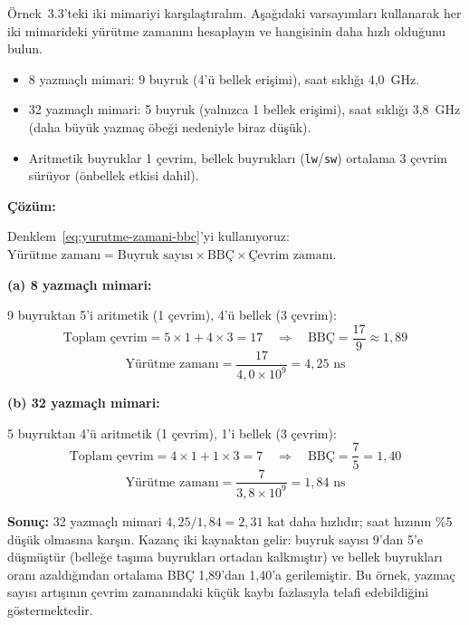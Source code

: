 \begin{ornek}[3.4]
\label{orn:yazmac-basarim}
Örnek~3.3'teki iki mimariyi karşılaştıralım. Aşağıdaki varsayımları kullanarak her iki mimarideki yürütme zamanını hesaplayın ve hangisinin daha hızlı olduğunu bulun.

\begin{itemize}[nosep]
\item 8 yazmaçlı mimari: 9 buyruk (4'ü bellek erişimi), saat sıklığı 4{,}0~GHz.
\item 32 yazmaçlı mimari: 5 buyruk (yalnızca 1 bellek erişimi), saat sıklığı 3{,}8~GHz (daha büyük yazmaç öbeği nedeniyle biraz düşük).
\item Aritmetik buyruklar 1 çevrim, bellek buyrukları (\texttt{lw}/\texttt{sw}) ortalama 3 çevrim sürüyor (önbellek etkisi dahil).
\end{itemize}

\textbf{Çözüm:}

Denklem~\ref{eq:yurutme-zamani-bbc}'yi kullanıyoruz: $\text{Yürütme zamanı} = \text{Buyruk sayısı} \times \text{BBÇ} \times \text{Çevrim zamanı}$.

\medskip
\textbf{(a) 8 yazmaçlı mimari:}

9 buyruktan 5'i aritmetik (1 çevrim), 4'ü bellek (3 çevrim):
\[
\text{Toplam çevrim} = 5 \times 1 + 4 \times 3 = 17 \quad\Rightarrow\quad \text{BBÇ} = \frac{17}{9} \approx 1{,}89
\]
\[
\text{Yürütme zamanı} = \frac{17}{4{,}0 \times 10^{9}} = 4{,}25 \text{ ns}
\]

\textbf{(b) 32 yazmaçlı mimari:}

5 buyruktan 4'ü aritmetik (1 çevrim), 1'i bellek (3 çevrim):
\[
\text{Toplam çevrim} = 4 \times 1 + 1 \times 3 = 7 \quad\Rightarrow\quad \text{BBÇ} = \frac{7}{5} = 1{,}40
\]
\[
\text{Yürütme zamanı} = \frac{7}{3{,}8 \times 10^{9}} = 1{,}84 \text{ ns}
\]

\textbf{Sonuç:} 32 yazmaçlı mimari $4{,}25 / 1{,}84 = 2{,}31$ kat daha hızlıdır; saat hızının \%5 düşük olmasına karşın. Kazanç iki kaynaktan gelir: buyruk sayısı 9'dan 5'e düşmüştür (belleğe taşıma buyrukları ortadan kalkmıştır) ve bellek buyrukları oranı azaldığından ortalama BBÇ 1{,}89'dan 1{,}40'a gerilemiştir. Bu örnek, yazmaç sayısı artışının çevrim zamanındaki küçük kaybı fazlasıyla telafi edebildiğini göstermektedir.
\end{ornek}

